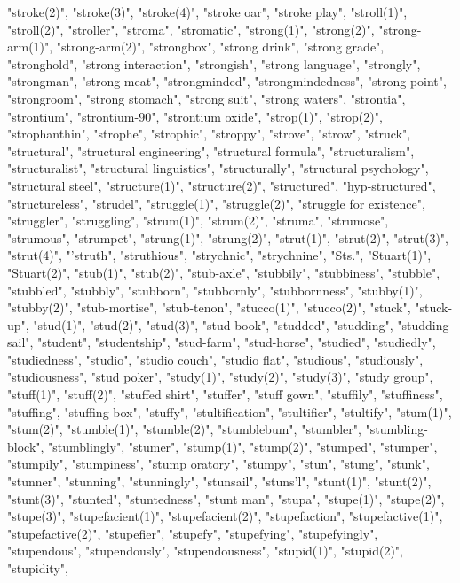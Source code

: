 "stroke(2)",
"stroke(3)",
"stroke(4)",
"stroke oar",
"stroke play",
"stroll(1)",
"stroll(2)",
"stroller",
"stroma",
"stromatic",
"strong(1)",
"strong(2)",
"strong-arm(1)",
"strong-arm(2)",
"strongbox",
"strong drink",
"strong grade",
"stronghold",
"strong interaction",
"strongish",
"strong language",
"strongly",
"strongman",
"strong meat",
"strongminded",
"strongmindedness",
"strong point",
"strongroom",
"strong stomach",
"strong suit",
"strong waters",
"strontia",
"strontium",
"strontium-90",
"strontium oxide",
"strop(1)",
"strop(2)",
"strophanthin",
"strophe",
"strophic",
"stroppy",
"strove",
"strow",
"struck",
"structural",
"structural engineering",
"structural formula",
"structuralism",
"structuralist",
"structural linguistics",
"structurally",
"structural psychology",
"structural steel",
"structure(1)",
"structure(2)",
"structured",
"hyp-structured",
"structureless",
"strudel",
"struggle(1)",
"struggle(2)",
"struggle for existence",
"struggler",
"struggling",
"strum(1)",
"strum(2)",
"struma",
"strumose",
"strumous",
"strumpet",
"strung(1)",
"strung(2)",
"strut(1)",
"strut(2)",
"strut(3)",
"strut(4)",
"'struth",
"struthious",
"strychnic",
"strychnine",
"Sts.",
"Stuart(1)",
"Stuart(2)",
"stub(1)",
"stub(2)",
"stub-axle",
"stubbily",
"stubbiness",
"stubble",
"stubbled",
"stubbly",
"stubborn",
"stubbornly",
"stubbornness",
"stubby(1)",
"stubby(2)",
"stub-mortise",
"stub-tenon",
"stucco(1)",
"stucco(2)",
"stuck",
"stuck-up",
"stud(1)",
"stud(2)",
"stud(3)",
"stud-book",
"studded",
"studding",
"studding-sail",
"student",
"studentship",
"stud-farm",
"stud-horse",
"studied",
"studiedly",
"studiedness",
"studio",
"studio couch",
"studio flat",
"studious",
"studiously",
"studiousness",
"stud poker",
"study(1)",
"study(2)",
"study(3)",
"study group",
"stuff(1)",
"stuff(2)",
"stuffed shirt",
"stuffer",
"stuff gown",
"stuffily",
"stuffiness",
"stuffing",
"stuffing-box",
"stuffy",
"stultification",
"stultifier",
"stultify",
"stum(1)",
"stum(2)",
"stumble(1)",
"stumble(2)",
"stumblebum",
"stumbler",
"stumbling-block",
"stumblingly",
"stumer",
"stump(1)",
"stump(2)",
"stumped",
"stumper",
"stumpily",
"stumpiness",
"stump oratory",
"stumpy",
"stun",
"stung",
"stunk",
"stunner",
"stunning",
"stunningly",
"stunsail",
"stuns'l",
"stunt(1)",
"stunt(2)",
"stunt(3)",
"stunted",
"stuntedness",
"stunt man",
"stupa",
"stupe(1)",
"stupe(2)",
"stupe(3)",
"stupefacient(1)",
"stupefacient(2)",
"stupefaction",
"stupefactive(1)",
"stupefactive(2)",
"stupefier",
"stupefy",
"stupefying",
"stupefyingly",
"stupendous",
"stupendously",
"stupendousness",
"stupid(1)",
"stupid(2)",
"stupidity",

